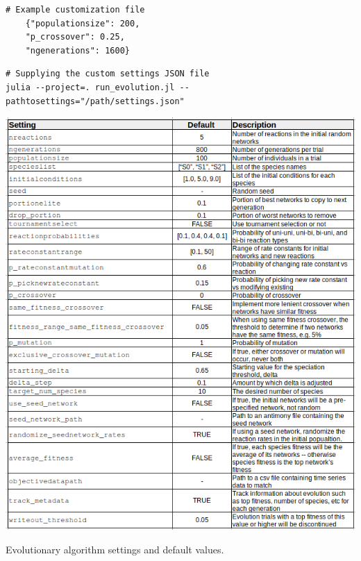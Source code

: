 \documentclass[12pt]{report}
\begin{document}
\begin{appendices}
\begin{Verbatim}[frame=single]
	# Example customization file
	{"populationsize": 200,
	"p_crossover": 0.25,
	"ngenerations": 1600}
\end{Verbatim}

\begin{Verbatim}[frame=single]
# Supplying the custom settings JSON file
julia --project=. run_evolution.jl --pathtosettings="/path/settings.json"
\end{Verbatim}


\begin{table}

    \includegraphics[width=18cm]{images/hyperparams.png}
    \caption[Evolution algorithm settings]{Evolutionary algorithm settings and default values.}
    \label{table:hyperparams}
\end{table}


\end{appendices}	



\end{document}
